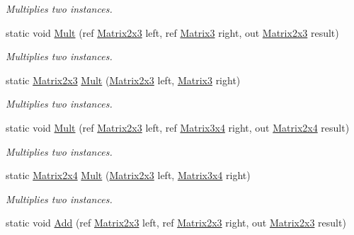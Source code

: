 \begin{DoxyCompactItemize}
\begin{DoxyCompactList}\small\item\em Multiplies two instances. \end{DoxyCompactList}\item 
static void \hyperlink{struct_open_t_k_1_1_matrix2x3_a758023da471e0c31144c4f27cdfc5025}{Mult} (ref \hyperlink{struct_open_t_k_1_1_matrix2x3}{Matrix2x3} left, ref \hyperlink{struct_open_t_k_1_1_matrix3}{Matrix3} right, out \hyperlink{struct_open_t_k_1_1_matrix2x3}{Matrix2x3} result)
\begin{DoxyCompactList}\small\item\em Multiplies two instances. \end{DoxyCompactList}\item 
static \hyperlink{struct_open_t_k_1_1_matrix2x3}{Matrix2x3} \hyperlink{struct_open_t_k_1_1_matrix2x3_ac66fde9f84209649dbd9b661b99a07f9}{Mult} (\hyperlink{struct_open_t_k_1_1_matrix2x3}{Matrix2x3} left, \hyperlink{struct_open_t_k_1_1_matrix3}{Matrix3} right)
\begin{DoxyCompactList}\small\item\em Multiplies two instances. \end{DoxyCompactList}\item 
static void \hyperlink{struct_open_t_k_1_1_matrix2x3_a933d2e6dbbbf963cd98659d848030d3c}{Mult} (ref \hyperlink{struct_open_t_k_1_1_matrix2x3}{Matrix2x3} left, ref \hyperlink{struct_open_t_k_1_1_matrix3x4}{Matrix3x4} right, out \hyperlink{struct_open_t_k_1_1_matrix2x4}{Matrix2x4} result)
\begin{DoxyCompactList}\small\item\em Multiplies two instances. \end{DoxyCompactList}\item 
static \hyperlink{struct_open_t_k_1_1_matrix2x4}{Matrix2x4} \hyperlink{struct_open_t_k_1_1_matrix2x3_aac8385b7d5d7c45756c4d44605a6f25d}{Mult} (\hyperlink{struct_open_t_k_1_1_matrix2x3}{Matrix2x3} left, \hyperlink{struct_open_t_k_1_1_matrix3x4}{Matrix3x4} right)
\begin{DoxyCompactList}\small\item\em Multiplies two instances. \end{DoxyCompactList}\item 
static void \hyperlink{struct_open_t_k_1_1_matrix2x3_a66e8b792b563fb8a77c92b50b051ae46}{Add} (ref \hyperlink{struct_open_t_k_1_1_matrix2x3}{Matrix2x3} left, ref \hyperlink{struct_open_t_k_1_1_matrix2x3}{Matrix2x3} right, out \hyperlink{struct_open_t_k_1_1_matrix2x3}{Matrix2x3} result)

\end{DoxyCompactItemize}
